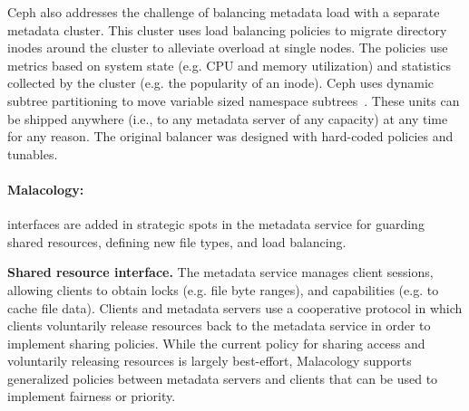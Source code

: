 \documentclass[preprint]{sigplanconf-eurosys}
\begin{document}
Ceph also addresses the challenge of balancing metadata load with a separate
metadata cluster. This cluster uses load balancing policies to migrate
directory inodes around the cluster to alleviate overload at single nodes. The
policies use metrics based on system state (e.g.  CPU and memory utilization)
and statistics collected by the cluster (e.g. the popularity of an inode). Ceph
uses dynamic subtree partitioning to move variable sized namespace
subtrees~\cite{weil:sc2004-dyn-metadata}. These units can be shipped anywhere
(i.e., to any metadata server of any capacity) at any time for any reason. The
original balancer was designed with hard-coded policies and tunables.


\paragraph*{Malacology:} interfaces are added in strategic spots in the
metadata service for guarding shared resources, defining new file types,
and load balancing.

{\bf Shared resource interface.}
The metadata service manages client sessions, allowing clients to obtain locks
(e.g. file byte ranges), and capabilities (e.g. to cache file data). Clients
and metadata servers use a cooperative protocol in which clients voluntarily
release resources back to the metadata service in order to implement sharing
policies. While the current policy for sharing access and voluntarily
releasing resources is largely best-effort, Malacology supports generalized
policies between metadata servers and clients that can be used to implement 
fairness or priority.
\end{document}
